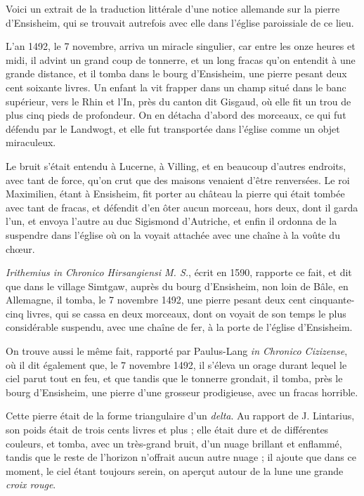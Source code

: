 \documentclass[a4paper, 12pt, oneside, french]{article}
\begin{document}
Voici un extrait de la traduction littérale d'une notice allemande sur la pierre d'Ensisheim, qui se trouvait autrefois avec elle dans l'église paroissiale de ce lieu.

\og L'an 1492, le 7 novembre, arriva un miracle singulier, car entre les onze heures et midi, il advint un grand coup de tonnerre, et un long fracas qu'on entendit à une grande distance, et il tomba dans le bourg d'Ensisheim, une pierre pesant deux cent soixante livres. Un enfant la vit frapper dans un champ situé dans le banc supérieur, vers le Rhin et l'In, près du canton dit Gisgaud, où elle fit un trou de plus cinq pieds de profondeur. On en détacha d'abord des morceaux, ce qui fut défendu par le Landwogt, et elle fut transportée dans l'église comme un objet miraculeux. \fg

\og Le bruit s'était entendu à Lucerne, à Villing, et en beaucoup d'autres endroits, avec tant de force, qu'on crut que des maisons venaient d'être renversées. Le roi Maximilien, étant à Ensisheim, fit porter au château la pierre qui était tombée avec tant de fracas, et défendit d'en ôter aucun morceau, hors deux, dont il garda l'un, et envoya l'autre au duc Sigismond d'Autriche, et enfin il ordonna de la suspendre dans l'église où on la voyait attachée avec une chaîne à la voûte du chœur. \fg

\emph{Irithemius in Chronico Hirsangiensi M. S.}, écrit en 1590, rapporte ce fait, et dit que dans le village Simtgaw, auprès du bourg d'Ensisheim, non loin de Bâle, en Allemagne, il tomba, le 7 novembre 1492, une pierre pesant deux cent cinquante-cinq livres, qui se cassa en deux morceaux, dont on voyait de son temps le plus considérable suspendu, avec une chaîne de fer, à la porte de l'église d'Ensisheim.

On trouve aussi le même fait, rapporté par Paulus-Lang \emph{in Chronico Cizizense}, où il dit également que, le 7 novembre 1492, il s'éleva un orage durant lequel le ciel parut tout en feu, et que tandis que le tonnerre grondait, il tomba, près le bourg d'Ensisheim, une pierre d'une grosseur prodigieuse, avec un fracas horrible.

Cette pierre était de la forme triangulaire d'un \emph{delta}. Au rapport de J. Lintarius, son poids était de trois cents livres et plus ; elle était dure et de différentes couleurs, et tomba, avec un très-grand bruit, d'un nuage brillant et enflammé, tandis que le reste de l'horizon n'offrait aucun autre nuage ; il ajoute que dans ce moment, le ciel étant toujours serein, on aperçut autour de la lune une grande \emph{croix rouge}.
\end{document}
